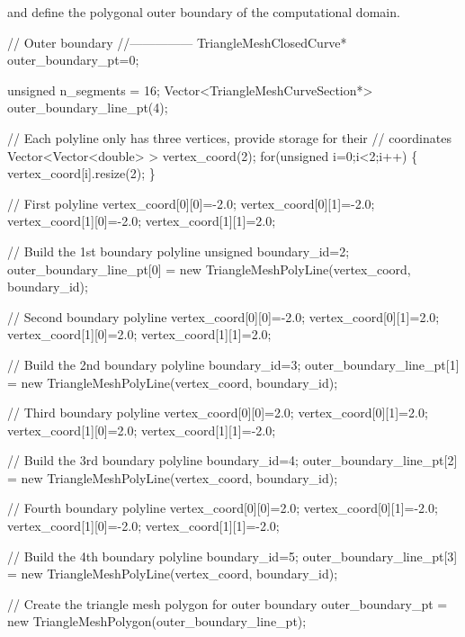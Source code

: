 and define the polygonal outer boundary of the computational domain. 
\begin{DoxyCodeInclude}

 \textcolor{comment}{// Outer boundary}
 \textcolor{comment}{//---------------}
 TriangleMeshClosedCurve* outer\_boundary\_pt=0;
 
 \textcolor{keywordtype}{unsigned} n\_segments = 16;
 Vector<TriangleMeshCurveSection*> outer\_boundary\_line\_pt(4);
 
 \textcolor{comment}{// Each polyline only has three vertices, provide storage for their}
 \textcolor{comment}{// coordinates}
 Vector<Vector<double> > vertex\_coord(2);
 \textcolor{keywordflow}{for}(\textcolor{keywordtype}{unsigned} i=0;i<2;i++)
  \{
   vertex\_coord[i].resize(2);
  \}

 \textcolor{comment}{// First polyline}
 vertex\_coord[0][0]=-2.0;
 vertex\_coord[0][1]=-2.0;
 vertex\_coord[1][0]=-2.0;
 vertex\_coord[1][1]=2.0;
 
 \textcolor{comment}{// Build the 1st boundary polyline}
 \textcolor{keywordtype}{unsigned} boundary\_id=2;
 outer\_boundary\_line\_pt[0] = \textcolor{keyword}{new} TriangleMeshPolyLine(vertex\_coord,
                                                      boundary\_id);
 
 \textcolor{comment}{// Second boundary polyline}
 vertex\_coord[0][0]=-2.0;
 vertex\_coord[0][1]=2.0;
 vertex\_coord[1][0]=2.0;
 vertex\_coord[1][1]=2.0;
 
 \textcolor{comment}{// Build the 2nd boundary polyline}
 boundary\_id=3;
 outer\_boundary\_line\_pt[1] = \textcolor{keyword}{new} TriangleMeshPolyLine(vertex\_coord,
                                                      boundary\_id);
 
 \textcolor{comment}{// Third boundary polyline}
 vertex\_coord[0][0]=2.0;
 vertex\_coord[0][1]=2.0;
 vertex\_coord[1][0]=2.0;
 vertex\_coord[1][1]=-2.0;
 
 \textcolor{comment}{// Build the 3rd boundary polyline}
 boundary\_id=4;
 outer\_boundary\_line\_pt[2] = \textcolor{keyword}{new} TriangleMeshPolyLine(vertex\_coord,
                                                      boundary\_id);
 
 \textcolor{comment}{// Fourth boundary polyline}
 vertex\_coord[0][0]=2.0;
 vertex\_coord[0][1]=-2.0;
 vertex\_coord[1][0]=-2.0;
 vertex\_coord[1][1]=-2.0;
 
 \textcolor{comment}{// Build the 4th boundary polyline}
 boundary\_id=5;
 outer\_boundary\_line\_pt[3] = \textcolor{keyword}{new} TriangleMeshPolyLine(vertex\_coord,
                                                      boundary\_id);
 
 \textcolor{comment}{// Create the triangle mesh polygon for outer boundary}
 outer\_boundary\_pt = \textcolor{keyword}{new} TriangleMeshPolygon(outer\_boundary\_line\_pt);

\end{DoxyCodeInclude}


